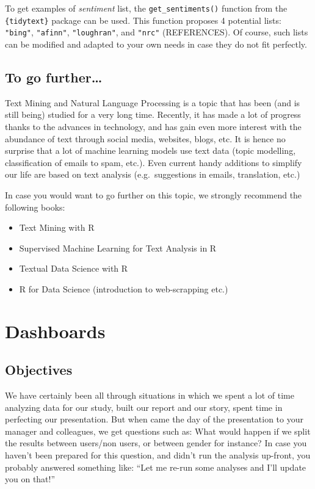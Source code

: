 \documentclass[
]{book}
\providecommand{\tightlist}{%
  \setlength{\itemsep}{0pt}\setlength{\parskip}{0pt}}
\begin{document}
To get examples of \emph{sentiment} list, the \texttt{get\_sentiments()} function from the \texttt{\{tidytext\}} package can be used. This function proposes 4 potential lists: \texttt{"bing"}, \texttt{"afinn"}, \texttt{"loughran"}, and \texttt{"nrc"} (REFERENCES). Of course, such lists can be modified and adapted to your own needs in case they do not fit perfectly.

\hypertarget{to-go-further-2}{%
\section{To go further\ldots{}}\label{to-go-further-2}}

Text Mining and Natural Language Processing is a topic that has been (and is still being) studied for a very long time. Recently, it has made a lot of progress thanks to the advances in technology, and has gain even more interest with the abundance of text through social media, websites, blogs, etc. It is hence no surprise that a lot of machine learning models use text data (topic modelling, classification of emails to spam, etc.). Even current handy additions to simplify our life are based on text analysis (e.g.~suggestions in emails, translation, etc.)

In case you would want to go further on this topic, we strongly recommend the following books:

\begin{itemize}
\tightlist
\item
  Text Mining with R
\item
  Supervised Machine Learning for Text Analysis in R
\item
  Textual Data Science with R
\item
  R for Data Science (introduction to web-scrapping etc.)
\end{itemize}

\hypertarget{dashboards}{%
\chapter{Dashboards}\label{dashboards}}

\hypertarget{objectives}{%
\section{Objectives}\label{objectives}}

We have certainly been all through situations in which we spent a lot of time analyzing data for our study, built our report and our story, spent time in perfecting our presentation. But when came the day of the presentation to your manager and colleagues, we get questions such as: What would happen if we split the results between users/non users, or between gender for instance? In case you haven't been prepared for this question, and didn't run the analysis up-front, you probably answered something like: ``Let me re-run some analyses and I'll update you on that!''
\end{document}
